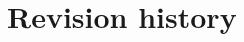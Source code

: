 \documentclass[../constitution.tex]{subfiles}
\begin{document}
\part*{Revision history}
\end{document}
